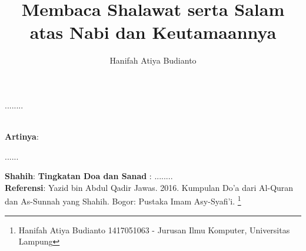 \documentclass[a4paper,12pt]{article}
\title{\Large Membaca Shalawat serta Salam atas Nabi dan Keutamaannya}
\author{\calligra Hanifah Atiya Budianto}
\begin{document}
\sffamily
\maketitle 
\fullvocalize
{}
\begin{arabtext}
\noindent
........ \\ \\
\end{arabtext}
\noindent
\textbf{Artinya}:
\par
\indent
...... \\
\par
\noindent
\textbf{Shahih}: 
\textbf{Tingkatan Doa dan Sanad} : ........\\
\textbf{Referensi}: Yazid bin Abdul Qadir Jawas. 2016. Kumpulan Do'a dari
Al-Quran dan As-Sunnah yang Shahih. Bogor: Pustaka Imam Asy-Syafi'i.
\footnote{Hanifah Atiya Budianto 1417051063 - Jurusan Ilmu Komputer,
Universitas Lampung}
\end{document}
